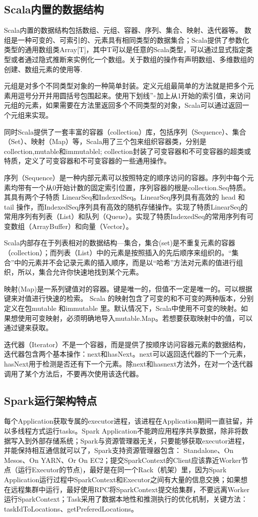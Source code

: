 \documentclass[UTF8,a4paper,10pt,nocolorlinks]{ctexart}
\begin{document}
\subsection{Scala内置的数据结构}
Scala内置的数据结构包括数组、元组、容器、序列、集合、映射、迭代器等。
数组是一种可变的、可索引的、元素具有相同类型的数据集合；Scala提供了参数化类型的通用数组类Array[T]，其中T可以是任意的Scala类型，可以通过显式指定类型或者通过隐式推断来实例化一个数组。关于数组的操作有声明数组、多维数组的创建、数组元素的使用等.\par
元组是对多个不同类型对象的一种简单封装。定义元组最简单的方法就是把多个元素用逗号分开并用圆括号包围起来。使用下划线$"_"$加上从1开始的索引值，来访问元组的元素，如果需要在方法里返回多个不同类型的对象，Scala可以通过返回一个元组来实现。\par
同时Scala提供了一套丰富的容器（collection）库，包括序列（Sequence）、集合（Set）、映射（Map）等，Scala用了三个包来组织容器类，分别是collection,mutable和immutablel; collection封装了可变容器和不可变容器的超类或特质，定义了可变容器和不可变容器的一些通用操作。\par
序列（Sequence）是一种内部元素可以按照特定的顺序访问的容器。序列中每个元素均带有一个从0开始计数的固定索引位置，序列容器的根是collection.Seq特质。其具有两个子特质 LinearSeq和IndexedSeq。LinearSeq序列具有高效的 head 和 tail 操作，而IndexedSeq序列具有高效的随机存储操作。实现了特质LinearSeq的常用序列有列表（List）和队列（Queue）。实现了特质IndexedSeq的常用序列有可变数组（ArrayBuffer）和向量（Vector）。\par
Scala内部存在于列表相对的数据结构---集合，集合(set)是不重复元素的容器（collection）；而列表（List）中的元素是按照插入的先后顺序来组织的。“集合”中的元素并不会记录元素的插入顺序，而是以“哈希”方法对元素的值进行组织，所以，集合允许你快速地找到某个元素。\par
映射(Map)是一系列键值对的容器。键是唯一的，但值不一定是唯一的。可以根据键来对值进行快速的检索。 Scala 的映射包含了可变的和不可变的两种版本，分别定义在包mutable 和immutable 里。默认情况下，Scala中使用不可变的映射。如果想使用可变映射，必须明确地导入mutable.Map。若想要获取映射中的值，可以通过键来获取。\par
迭代器（Iterator）不是一个容器，而是提供了按顺序访问容器元素的数据结构，迭代器包含两个基本操作：next和hasNext。next可以返回迭代器的下一个元素，hasNext用于检测是否还有下一个元素。除next和hasnext方法外，在对一个迭代器调用了某个方法后，不要再次使用该迭代器。\par
\subsection{Spark运行架构特点}
每个Application获取专属的executor进程，该进程在Application期间一直驻留，并以多线程方式运行tasks。Spark Application不能跨应用程序共享数据，除非将数据写入到外部存储系统；Spark与资源管理器无关，只要能够获取executor进程，并能保持相互通信就可以了，Spark支持资源管理器包含： Standalone、On Mesos、On YARN、Or On EC2；提交SparkContext的Client应该靠近Worker节点（运行Executor的节点)，最好是在同一个Rack（机架）里，因为Spark Application运行过程中SparkContext和Executor之间有大量的信息交换；如果想在远程集群中运行，最好使用RPC将SparkContext提交给集群，不要远离Worker运行SparkContext；Task采用了数据本地性和推测执行的优化机制，关键方法：taskIdToLocations、getPreferedLocations。
\end{document}
